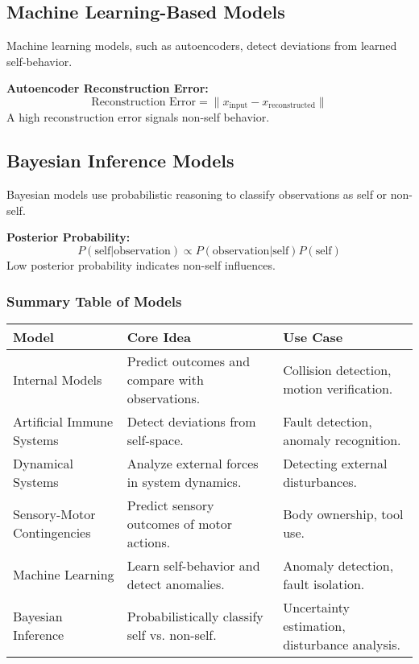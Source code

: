 \subsection{Machine Learning-Based Models}
Machine learning models, such as autoencoders, detect deviations from learned self-behavior.

\textbf{Autoencoder Reconstruction Error:}
\begin{equation}
    \text{Reconstruction Error} = \| x_{\text{input}} - x_{\text{reconstructed}} \|
\end{equation}
A high reconstruction error signals non-self behavior.

\subsection{Bayesian Inference Models}
Bayesian models use probabilistic reasoning to classify observations as self or non-self.

\textbf{Posterior Probability:}
\begin{equation}
    P(\text{self} | \text{observation}) \propto P(\text{observation} | \text{self}) P(\text{self})
\end{equation}
Low posterior probability indicates non-self influences.

\subsubsection{Summary Table of Models}

\begin{tabular}{|l|p{6cm}|p{5cm}|}
    \hline
    \textbf{Model}              & \textbf{Core Idea}                              & \textbf{Use Case}                             \\ \hline
    Internal Models             & Predict outcomes and compare with observations. & Collision detection, motion verification.     \\ \hline
    Artificial Immune Systems   & Detect deviations from self-space.              & Fault detection, anomaly recognition.         \\ \hline
    Dynamical Systems           & Analyze external forces in system dynamics.     & Detecting external disturbances.              \\ \hline
    Sensory-Motor Contingencies & Predict sensory outcomes of motor actions.      & Body ownership, tool use.                     \\ \hline
    Machine Learning            & Learn self-behavior and detect anomalies.       & Anomaly detection, fault isolation.           \\ \hline
    Bayesian Inference          & Probabilistically classify self vs. non-self.   & Uncertainty estimation, disturbance analysis. \\ \hline
\end{tabular}

